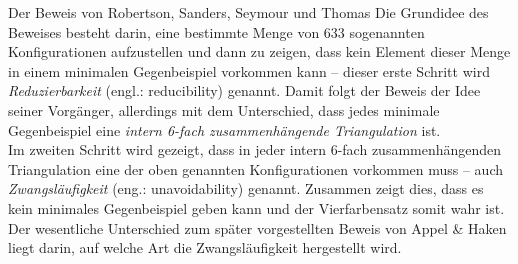 \begin{chapter}{Der Beweis von Robertson, Sanders, Seymour und Thomas}
  Die Grundidee des Beweises besteht darin, eine bestimmte Menge von 633 sogenannten Konfigurationen aufzustellen und dann zu zeigen, dass kein Element dieser Menge in einem minimalen Gegenbeispiel vorkommen kann -- dieser erste Schritt wird \textit{Reduzierbarkeit} (engl.: reducibility) genannt. Damit folgt der Beweis der Idee seiner Vorgänger, allerdings mit dem Unterschied, dass jedes minimale Gegenbeispiel eine \textit{intern 6-fach zusammenhängende Triangulation} ist. \\
  Im zweiten Schritt wird gezeigt, dass in jeder intern 6-fach zusammenhängenden Triangulation eine der oben genannten Konfigurationen vorkommen muss -- auch \textit{Zwangsläufigkeit} (eng.: unavoidability) genannt. Zusammen zeigt dies, dass es kein minimales Gegenbeispiel geben kann und der Vierfarbensatz somit wahr ist. \\
  Der wesentliche Unterschied zum später vorgestellten Beweis von Appel \& Haken liegt darin, auf welche Art die Zwangsläufigkeit hergestellt wird.
  
  
  
  
  
\end{chapter}
